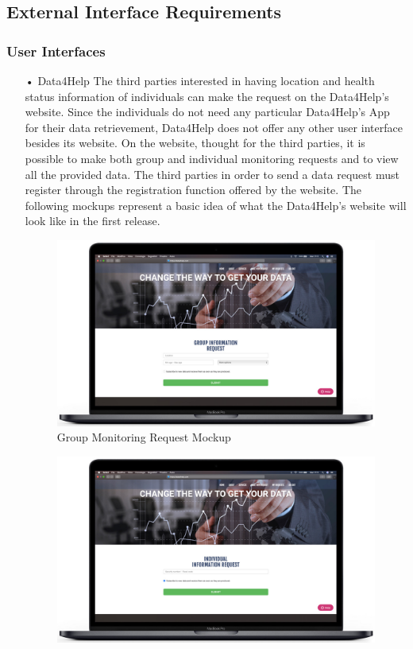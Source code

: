 \subsection{External Interface Requirements}
\subsubsection{User Interfaces}
\begin{enumerate}
\item[•]{\Large Data4Help}
\medbreak
\noindent
The third parties interested in having location and health status information of individuals can make the request on the Data4Help’s website. Since the individuals do not need any particular Data4Help’s App for their data retrievement, Data4Help does not offer any other user interface besides its website. 
On the website, thought for the third parties, it is possible to make both group and individual monitoring requests and to view all the provided data. The third parties in order to send a data request must register through the registration function offered by the website.
\bigbreak
\noindent
The following mockups represent a basic idea of what the Data4Help’s website will look like in the first release.
\\ [2cm]
\begin{figure}[H]
\centering
\includegraphics[scale=0.3]{Images/Mockups/Grouprequest.jpg}
\caption{Group Monitoring Request Mockup}
\end{figure}
\begin{figure}
\centering
\includegraphics[scale=0.3]{Images/Mockups/IndividualRequest.jpg}

\end{figure}
\end{enumerate}
